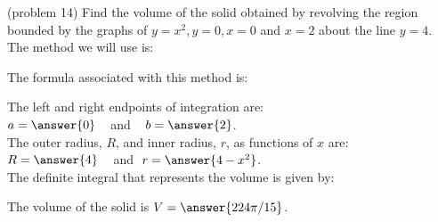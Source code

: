 \documentclass[handout]{ximera}
\begin{document}
\begin{problem}(problem 14)
Find the volume of the solid obtained by revolving the region bounded by the graphs of $y = x^2, y = 0, x = 0$ and $x = 2$ about the line $y = 4$.\\
The method we will use is:
\begin{multipleChoice}
\end{multipleChoice}

The formula associated with this method is:
\begin{multipleChoice}
\end{multipleChoice}

The left and right endpoints of integration are:\\
$a = \answer{0}\;\;\;$ and $\;\;\; b = \answer{2}$.\\
The outer radius, $R$, and inner radius, $r$, as functions of $x$ are:\\
$R = \answer{4} \;\;\;$ and $\; r = \answer{4-x^2}$.\\

The definite integral that represents the volume is given by:\\
\begin{multipleChoice}
\end{multipleChoice}

The volume of the solid is $V = \answer{224\pi/15}$.

\end{problem}
\end{document}

